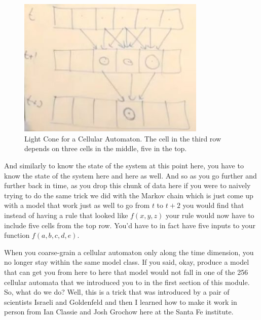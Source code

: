 \documentclass[]{article}
\begin{document}
\begin{figure}[H]
	\begin{center}
		\caption[Light Cone for a Cellular Automaton]{Light Cone for a Cellular Automaton. The cell in the third row depends on three cells in the middle, five in the top.}
		\includegraphics[width=0.8\textwidth]{cellular-automaton-light-cone}
	\end{center}
\end{figure}

And similarly to know the state of the system at this point here, you have to know the state of the system here and here as well.
And so as you go further and further back in time, as you drop this chunk of data here if you were to naively trying to do the same trick we did with the Markov chain
which is just come up with a model that work just as well to go from $t$ to $t+2$ you would find that instead of having a rule that looked like $f(x,y,z)$ your rule would now have to include five cells from the top row.
You'd have to in fact have five inputs to your function $f(a,b,c,d,e)$.

When you coarse-grain a cellular automaton only along the time dimension, you no longer stay within the same model class.
If you said, okay, produce a model that can get you from here to here that model would not fall in one of the 256 cellular automata that we introduced you to
in the first section of this module.
So, what do we do? Well, this is a trick that was introduced by a pair of scientists
Israeli and Goldenfeld\cite{israeli2004computational,israeli2006coarse}
and then I learned how to make it work in person from Ian Classie and Josh Grochow here at the Santa Fe institute.
\end{document}
